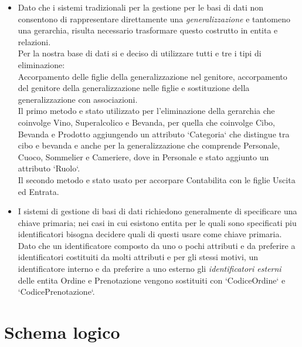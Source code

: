 \begin{itemize}
    \item Dato che i sistemi tradizionali per la gestione per le basi di dati non consentono di rappresentare direttamente una \textit{generalizzazione} e tantomeno una gerarchia, risulta necessario trasformare questo costrutto in entita e relazioni. \\
    Per la nostra base di dati si e deciso di utilizzare tutti e tre i tipi di eliminazione:\\
    Accorpamento delle figlie della generalizzazione nel genitore, accorpamento del genitore della generalizzazione nelle figlie e sostituzione della generalizzazione con associazioni.\\ %
    Il primo metodo e stato utilizzato per l'eliminazione della gerarchia che coinvolge Vino, Superalcolico e Bevanda, per quella che coinvolge Cibo, Bevanda e Prodotto aggiungendo un attributo `Categoria` che distingue tra cibo e bevanda e anche per la generalizzazione che comprende Personale, Cuoco, Sommelier e Cameriere, dove in Personale e stato aggiunto un attributo `Ruolo`.\\
    Il secondo metodo e stato usato per accorpare Contabilita con le figlie Uscita ed Entrata.
    \item I sistemi di gestione di basi di dati richiedono generalmente di specificare una chiave primaria; nei casi in cui esistono entita per le quali sono specificati piu identificatori bisogna decidere quali di questi usare come chiave primaria. \\
    Dato che un identificatore composto da uno o pochi attributi e da preferire a identificatori costituiti da molti attributi e per gli stessi motivi, un identificatore interno e da preferire a uno esterno gli \textit{identificatori esterni} delle entita Ordine e Prenotazione vengono sostituiti con `CodiceOrdine` e `CodicePrenotazione`.
\end{itemize}

\section{Schema logico}
